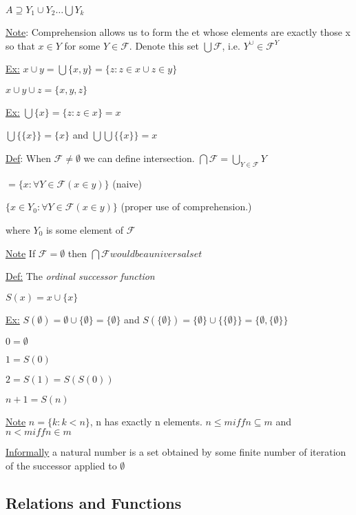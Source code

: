 \documentclass{article}
\begin{document}
    $A \supseteq Y_1 \cup Y_2 \dots \bigcup Y_k$

    \vspace{1em}
    \underline{Note}: Comprehension allows us to form the et whose elements are exactly those x so that $x \in Y$ for some $Y \in \mathcal{F}$. Denote this set $\bigcup \mathcal{F}$, i.e. $Y^\cup \in \mathcal{F}^Y$

    \underline{Ex:} $x \cup y = \bigcup \{x,y\} =\{z : z \in x \cup z \in y\}$

    $x \cup y \cup z = \big \{x,y,z\}$

    \vspace{1em}
    \underline{Ex:} $\bigcup\{x\} = \{z : z \in x\} = x$

    $ \bigcup\{\{x\}\} = \{x\}$ and $\bigcup \bigcup\{\{x\}\} = x$

    \vspace{1em}
    \underline{Def}: When $\mathcal{F} \neq \emptyset$ we can define intersection. $\bigcap \mathcal{F} = \bigcup_{Y \in \mathcal{F}} Y$

    $=\{x : \forall Y \in \mathcal{F} (x \in y)\}$ (naive)

    $\{x\in Y_0 : \forall Y \in \mathcal{F}(x \in y)\}$ (proper use of comprehension.)

    where $Y_0$ is some element of $\mathcal{F}$

    \underline{Note} If $\mathcal{F} = \emptyset$ then $\bigcap \mathcal{F} would be a universal set$

    \vspace{1em}
    \underline{Def:} The \emph{ordinal successor function}

    $S(x) = x \cup \{x\}$

    \underline{Ex:} $S(\emptyset) = \emptyset \cup \{\emptyset\} = \{\emptyset\}$ and $S(\{\emptyset\}) = \{\emptyset\} \cup \{\{\emptyset\}\} = \{\emptyset,\{\emptyset\}\}$

    $0 = \emptyset$

    $1 = S(0)$

    $2 = S(1) = S(S(0))$

    $n+1 = S(n)$

    \underline{Note} $n = \{ k : k < n\}$, n has exactly n elements. $n \leq m iff n \subseteq m$ and $n < m iff n \in m$

    \underline{Informally} a natural number is a set obtained by some finite number of iteration of the successor applied to $\emptyset$


    \subsection{Relations and Functions}
\end{document}

